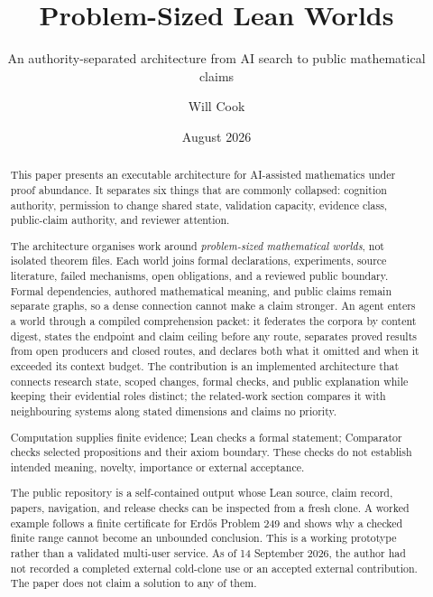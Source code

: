 \documentclass[10pt]{article}
\title{Problem-Sized Lean Worlds}
\subtitle{An authority-separated architecture from AI search to public mathematical claims}
\author{Will Cook}
\date{August 2026}
\begin{document}
\maketitle
\paperprovenance
\fontsize{9.2pt}{11pt}\selectfont

\begin{abstract}
This paper presents an executable architecture for AI-assisted mathematics
under proof abundance. It separates six things that are commonly collapsed:
cognition authority, permission to change shared state, validation capacity,
evidence class, public-claim authority, and reviewer attention.

The architecture organises work around \emph{problem-sized mathematical
worlds}, not isolated theorem files. Each world joins formal declarations,
experiments, source literature, failed mechanisms, open obligations, and a
reviewed public boundary. Formal dependencies, authored mathematical meaning,
and public claims remain separate graphs, so a dense connection cannot make a
claim stronger. An agent enters a world through a compiled comprehension
packet: it federates the corpora by content digest, states the endpoint and
claim ceiling before any route, separates proved results from open producers
and closed routes, and declares both what it omitted and when it exceeded its
context budget. The contribution is an implemented architecture that connects
research state, scoped changes, formal checks, and public explanation while
keeping their evidential roles distinct; the related-work section compares it
with neighbouring systems along stated dimensions and claims no priority.

Computation supplies finite evidence; Lean checks a formal statement;
Comparator checks selected propositions and their axiom boundary. These checks
do not establish intended meaning, novelty, importance or external acceptance.

The public repository is a self-contained output whose Lean source, claim
record, papers, navigation, and release checks can be inspected from a fresh
clone. A worked example follows a finite certificate for Erd\H{o}s Problem 249
and shows why a checked finite range cannot become an unbounded conclusion.
This is a working prototype rather than a validated multi-user service. As of
14 September 2026, the author had not recorded a completed external cold-clone use
or an accepted external contribution.
The paper does not claim a solution to any of them.
\end{abstract}
\end{document}
